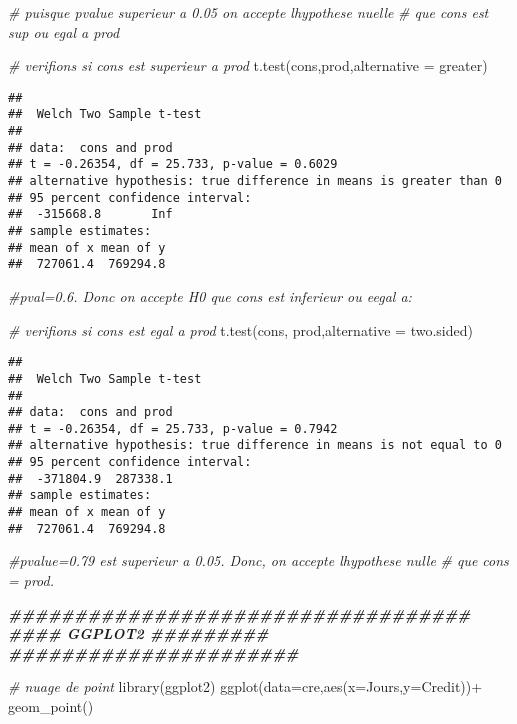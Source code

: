 \documentclass[
]{article}
\newenvironment{Shaded}{\begin{snugshade}}{\end{snugshade}}
\newcommand{\AttributeTok}[1]{\textcolor[rgb]{0.77,0.63,0.00}{#1}}
\newcommand{\CommentTok}[1]{\textcolor[rgb]{0.56,0.35,0.01}{\textit{#1}}}
\newcommand{\DocumentationTok}[1]{\textcolor[rgb]{0.56,0.35,0.01}{\textbf{\textit{#1}}}}
\newcommand{\FunctionTok}[1]{\textcolor[rgb]{0.00,0.00,0.00}{#1}}
\newcommand{\NormalTok}[1]{#1}
\newcommand{\SpecialCharTok}[1]{\textcolor[rgb]{0.00,0.00,0.00}{#1}}
\newcommand{\StringTok}[1]{\textcolor[rgb]{0.31,0.60,0.02}{#1}}
\begin{document}
\begin{Shaded}
\begin{Highlighting}[]
\CommentTok{\# puisque pvalue superieur a 0.05 on accepte l\textquotesingle{}hypothese nuelle}
\CommentTok{\# que cons est sup ou egal a prod}




\CommentTok{\# verifions si cons est superieur a prod}
\FunctionTok{t.test}\NormalTok{(cons,prod,}\AttributeTok{alternative =} \StringTok{\textquotesingle{}greater\textquotesingle{}}\NormalTok{)}
\end{Highlighting}
\end{Shaded}

\begin{verbatim}
## 
##  Welch Two Sample t-test
## 
## data:  cons and prod
## t = -0.26354, df = 25.733, p-value = 0.6029
## alternative hypothesis: true difference in means is greater than 0
## 95 percent confidence interval:
##  -315668.8       Inf
## sample estimates:
## mean of x mean of y 
##  727061.4  769294.8
\end{verbatim}

\begin{Shaded}
\begin{Highlighting}[]
\CommentTok{\#pval=0.6. Donc on accepte H0 que cons est inferieur ou eegal a:}


\CommentTok{\# verifions si cons est egal a prod}
\FunctionTok{t.test}\NormalTok{(cons, prod,}\AttributeTok{alternative =} \StringTok{\textquotesingle{}two.sided\textquotesingle{}}\NormalTok{)}
\end{Highlighting}
\end{Shaded}

\begin{verbatim}
## 
##  Welch Two Sample t-test
## 
## data:  cons and prod
## t = -0.26354, df = 25.733, p-value = 0.7942
## alternative hypothesis: true difference in means is not equal to 0
## 95 percent confidence interval:
##  -371804.9  287338.1
## sample estimates:
## mean of x mean of y 
##  727061.4  769294.8
\end{verbatim}

\begin{Shaded}
\begin{Highlighting}[]
\CommentTok{\#pvalue=0.79 est superieur a 0.05. Donc, on accepte l\textquotesingle{}hypothese nulle}
\CommentTok{\# que cons = prod.}



\DocumentationTok{\#\#\#\#\#\#\#\#\#\#\#\#\#\#\#\#\#\#\#\#\#\#\#\#\#\#\#\#\#\#\#\#\#\#\#}
\DocumentationTok{\#\#\#\# GGPLOT2 \#\#\#\#\#\#\#\#\#}
\DocumentationTok{\#\#\#\#\#\#\#\#\#\#\#\#\#\#\#\#\#\#\#\#\#\#}

\CommentTok{\# nuage de point}
\FunctionTok{library}\NormalTok{(ggplot2)}
\FunctionTok{ggplot}\NormalTok{(}\AttributeTok{data=}\NormalTok{cre,}\FunctionTok{aes}\NormalTok{(}\AttributeTok{x=}\NormalTok{Jours,}\AttributeTok{y=}\NormalTok{Credit))}\SpecialCharTok{+}
  \FunctionTok{geom\_point}\NormalTok{()}
\end{Highlighting}
\end{Shaded}
\end{document}
